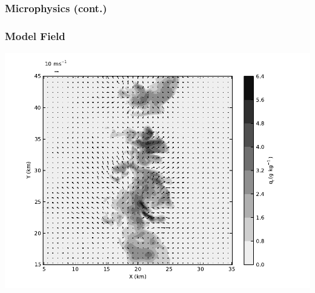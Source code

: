 \documentclass[red]{beamer}
\begin{document}
\begin{frame}
	\frametitle{Microphysics (cont.)}
\end{frame}

\begin{frame}
	\frametitle{Model Field}
	\includegraphics[scale=0.5]{figures/commas_wz_3600_qr_wind_vectors.pdf}
\end{frame}
\end{document}
